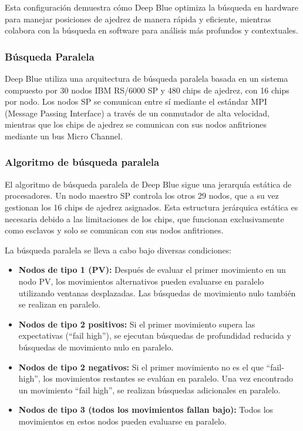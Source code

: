 \documentclass[12pt,a4paper]{article}
\begin{document}
Esta configuración demuestra cómo Deep Blue optimiza la búsqueda en hardware para manejar posiciones de ajedrez de manera rápida y eficiente, mientras colabora con la búsqueda en software para análisis más profundos y contextuales.

\subsubsection{Búsqueda Paralela}

Deep Blue utiliza una arquitectura de búsqueda paralela basada en un sistema compuesto por 30 nodos IBM RS/6000 SP y 480 chips de ajedrez, con 16 chips por nodo. Los nodos SP se comunican entre sí mediante el estándar MPI (Message Passing Interface) a través de un conmutador de alta velocidad, mientras que los chips de ajedrez se comunican con sus nodos anfitriones mediante un bus Micro Channel.

\subsubsection*{Algoritmo de búsqueda paralela}
El algoritmo de búsqueda paralela de Deep Blue sigue una jerarquía estática de procesadores. Un nodo maestro SP controla los otros 29 nodos, que a su vez gestionan los 16 chips de ajedrez asignados. Esta estructura jerárquica estática es necesaria debido a las limitaciones de los chips, que funcionan exclusivamente como esclavos y solo se comunican con sus nodos anfitriones.

La búsqueda paralela se lleva a cabo bajo diversas condiciones:
\begin{itemize}
    \item \textbf{Nodos de tipo 1 (PV):} Después de evaluar el primer movimiento en un nodo PV, los movimientos alternativos pueden evaluarse en paralelo utilizando ventanas desplazadas. Las búsquedas de movimiento nulo también se realizan en paralelo.
    \item \textbf{Nodos de tipo 2 positivos:} Si el primer movimiento supera las expectativas (``fail high''), se ejecutan búsquedas de profundidad reducida y búsquedas de movimiento nulo en paralelo.
    \item \textbf{Nodos de tipo 2 negativos:} Si el primer movimiento no es el que ``fail-high'', los movimientos restantes se evalúan en paralelo. Una vez encontrado un movimiento ``fail high'', se realizan búsquedas adicionales en paralelo.
    \item \textbf{Nodos de tipo 3 (todos los movimientos fallan bajo):} Todos los movimientos en estos nodos pueden evaluarse en paralelo.
\end{itemize}
\end{document}

